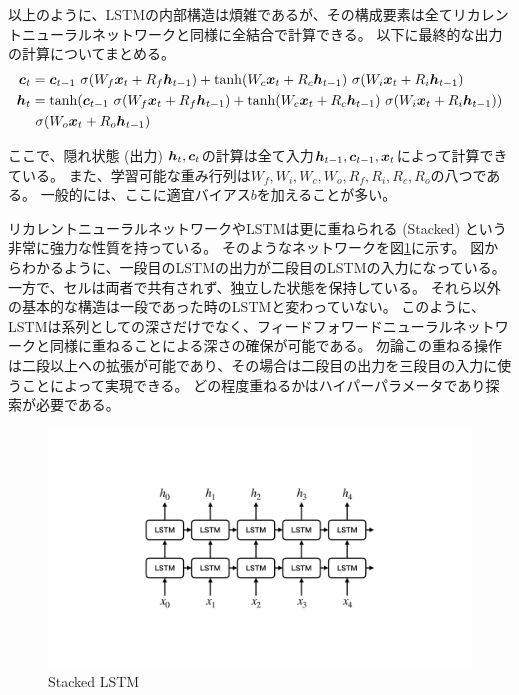 以上のように、LSTMの内部構造は煩雑であるが、その構成要素は全てリカレントニューラルネットワークと同様に全結合で計算できる。
以下に最終的な出力の計算についてまとめる。
\begin{equation}
 \begin{split}
  {\mbox{\boldmath{$c$}}}_{t} 
  &= {\mbox{\boldmath{$c$}}}_{t-1} \  \sigma (W_f {\mbox{\boldmath{$x$}}}_t + R_f {\mbox{\boldmath{$h$}}}_{t-1}) 
  + \tanh (W_c {\mbox{\boldmath{$x$}}}_t + R_c {\mbox{\boldmath{$h$}}}_{t-1}) \  \sigma (W_i {\mbox{\boldmath{$x$}}}_t + R_i {\mbox{\boldmath{$h$}}}_{t-1})\\
  {\mbox{\boldmath{$h$}}}_{t} 
  &= \tanh({\mbox{\boldmath{$c$}}}_{t-1} \  \sigma (W_f {\mbox{\boldmath{$x$}}}_t + R_f {\mbox{\boldmath{$h$}}}_{t-1}) 
  + \tanh (W_c {\mbox{\boldmath{$x$}}}_t + R_c {\mbox{\boldmath{$h$}}}_{t-1}) \  \sigma (W_i {\mbox{\boldmath{$x$}}}_t + R_i {\mbox{\boldmath{$h$}}}_{t-1})) \\
  &\  \sigma (W_o {\mbox{\boldmath{$x$}}}_t + R_o {\mbox{\boldmath{$h$}}}_{t-1})
 \end{split}
\end{equation}

ここで、隠れ状態 (出力) ${\mbox{\boldmath{$h$}}}_t,{\mbox{\boldmath{$c$}}}_t$の計算は全て入力${\mbox{\boldmath{$h$}}}_{t-1},{\mbox{\boldmath{$c$}}}_{t-1},{\mbox{\boldmath{$x$}}}_t$によって計算できている。
また、学習可能な重み行列は$W_f, W_i, W_c, W_o, R_f, R_i, R_c, R_o$の八つである。
一般的には、ここに適宜バイアス$b$を加えることが多い。

リカレントニューラルネットワークやLSTMは更に重ねられる (Stacked) という非常に強力な性質を持っている。
そのようなネットワークを図\ref{16StackedLSTM}に示す。
図からわかるように、一段目のLSTMの出力が二段目のLSTMの入力になっている。
一方で、セルは両者で共有されず、独立した状態を保持している。
それら以外の基本的な構造は一段であった時のLSTMと変わっていない。
このように、LSTMは系列としての深さだけでなく、フィードフォワードニューラルネットワークと同様に重ねることによる深さの確保が可能である。
勿論この重ねる操作は二段以上への拡張が可能であり、その場合は二段目の出力を三段目の入力に使うことによって実現できる。
どの程度重ねるかはハイパーパラメータであり探索が必要である。

\begin{figure}[htbp]
 \centering
 \includegraphics[trim = 0 200 0 200, width=1.0\textwidth, clip]{Figure/2DeepLearning/16StackedLSTM.png}
 \caption{Stacked LSTM}
 \label{16StackedLSTM}
\end{figure}

